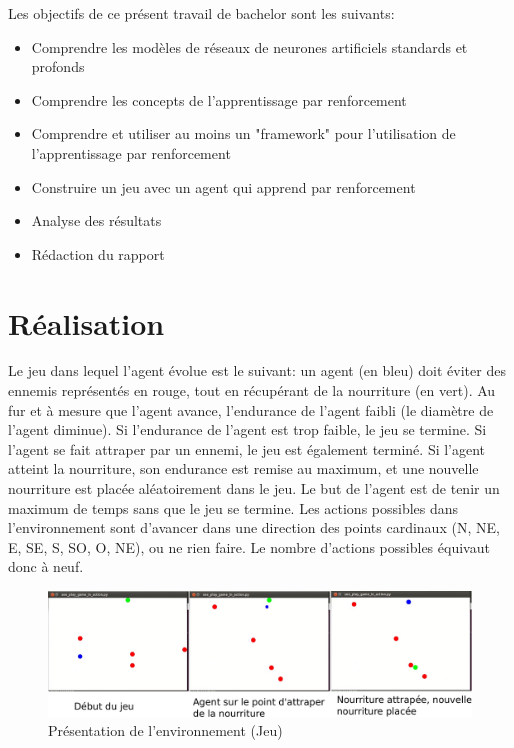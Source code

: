 \documentclass[11pt,a4paper]{report}
\begin{document}
  \par Les objectifs de ce présent travail de bachelor sont les suivants: 
  
  \renewcommand{\labelitemi}{\textbullet}
  \begin{itemize}
  \item Comprendre les modèles de réseaux de neurones artificiels standards et profonds
  \item Comprendre les concepts de l'apprentissage par renforcement
  \item Comprendre et utiliser au moins un "framework" pour l’utilisation de l'apprentissage par renforcement
  \item Construire un jeu avec un agent qui apprend par renforcement
  \item Analyse des résultats 
  \item Rédaction du rapport
  \end{itemize}
  
  \section{Réalisation}
  
  \par Le jeu dans lequel l'agent évolue est le suivant: un agent (en bleu) doit éviter des ennemis représentés en rouge, tout en récupérant de la nourriture (en vert). Au fur et à mesure que l'agent avance, l'endurance de l'agent faibli (le diamètre de l'agent diminue). Si l'endurance de l'agent est trop faible, le jeu se termine. Si l'agent se fait attraper par un ennemi, le jeu est également terminé. Si l'agent atteint la nourriture, son endurance est remise au maximum, et une nouvelle nourriture est placée aléatoirement dans le jeu. Le but de l'agent est de tenir un maximum de temps sans que le jeu se termine. Les actions possibles dans l'environnement sont d'avancer dans une direction des points cardinaux (N, NE, E, SE, S, SO, O, NE), ou ne rien faire. Le nombre d'actions possibles équivaut donc à neuf. 
  
   \begin{figure}[!h]
   \center
   \includegraphics[scale=0.2]{ressources/presentation_jeu.png}
   \caption{Présentation de l'environnement (Jeu)}
   \end{figure} 
  
\end{document}
